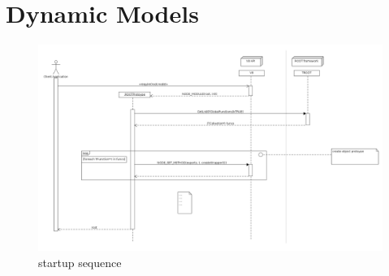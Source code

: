 \pagebreak[4]

\section{Dynamic Models}
\begin{figure}[htb]
	\centering
	\includegraphics[width=18cm]{./latex/resources/startupSequence.png}
	\caption{startup sequence}
\end{figure}
